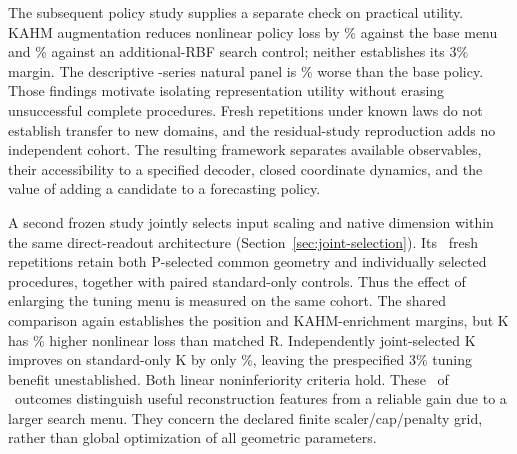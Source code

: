 The subsequent policy study supplies a separate check on practical
utility. KAHM augmentation reduces nonlinear policy loss by
\PAGainPZero\% against the base menu and \PAGainExtra\% against an
additional-RBF search control; neither establishes its $3\%$ margin.
The descriptive \PANaturalSeries-series natural panel is
\PANaturalPenalty\% worse than the base policy. Those findings motivate
isolating representation utility without erasing unsuccessful complete
procedures. Fresh repetitions under known laws do not establish transfer
to new domains, and the residual-study reproduction adds no independent
cohort. The resulting framework separates available observables,
their accessibility to a specified decoder, closed coordinate dynamics,
and the value of adding a candidate to a forecasting policy.

A second frozen study jointly selects input scaling and native dimension
within the same direct-readout architecture
(Section~\ref{sec:joint-selection}). Its \JSRepetitions\ fresh repetitions
retain both P-selected common geometry and individually selected
procedures, together with paired standard-only controls. Thus the effect
of enlarging the tuning menu is measured on the same cohort. The shared
comparison again establishes the position and KAHM-enrichment margins,
but K has \JSRelativeLossChangeKR\% higher nonlinear loss than matched R.
Independently joint-selected K improves on standard-only K by only
\JSGainJointKNonlinear\%, leaving the prespecified 3\% tuning benefit
unestablished. Both linear noninferiority criteria hold. These
\JSCriteriaEstablished\ of \JSFamilySize\ outcomes distinguish useful
reconstruction features from a reliable gain due to a larger search menu.
They concern the declared finite scaler/cap/penalty grid, rather than
global optimization of all geometric parameters.
